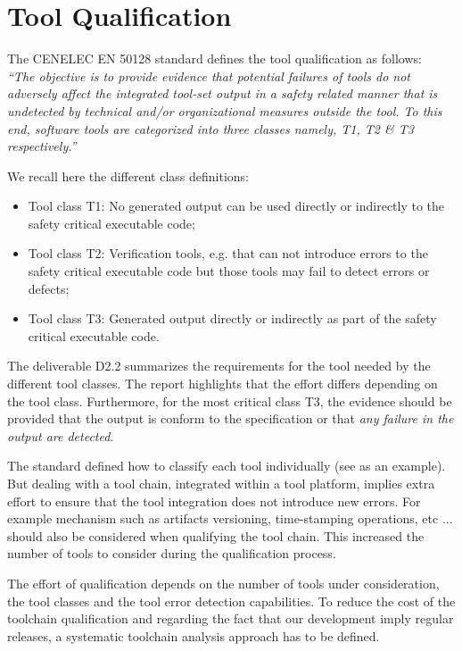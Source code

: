 \section{Tool Qualification}
\label{sec:sota-tool-qualification}


The CENELEC EN 50128 standard \cite{standard_railway_2011} defines the tool
qualification as follows:\\
{\it ``The objective is to provide evidence that potential
failures of tools do not adversely affect the integrated tool-set output in a
safety related manner that is undetected by technical and/or organizational
measures outside the tool. To this end, software tools are categorized into
three classes namely, T1, T2 \& T3 respectively.''}

We recall here the different class definitions:
\begin{itemize}
\item Tool class T1: No generated output can be used directly or indirectly to the
  safety critical executable code;
\item Tool class T2: Verification tools, e.g. that can not introduce
  errors to the safety critical executable code but those tools may fail to detect errors or
  defects;
\item Tool class T3: Generated output directly or indirectly  as part of the
  safety critical executable code.
\end{itemize}
The deliverable D2.2 \cite{pokam_report_2013} summarizes the requirements for the
tool needed by the different tool classes. The report highlights that the
effort differs depending on the tool class. Furthermore, for
the most critical class T3,  the evidence should be provided that the output is
conform to the specification or that \emph{any failure in the output
  are detected}. 

The standard defined how to classify each tool individually (see
\cite{nielsen_efficient_2012,huang_test_2013} as an example).  But dealing with a tool
chain, integrated within a tool platform, implies extra effort to
ensure that the tool integration does not introduce new errors. For
example mechanism such as artifacts versioning, time-stamping
operations, etc ... should also be considered when qualifying the tool
chain. This increased the number of tools to consider during the
qualification process.

The effort of qualification depends on the number of tools under
consideration, the tool classes and the tool error detection
capabilities. To reduce the cost of the toolchain qualification and
regarding the fact that our development imply regular releases, a
systematic toolchain analysis approach has to be defined.

